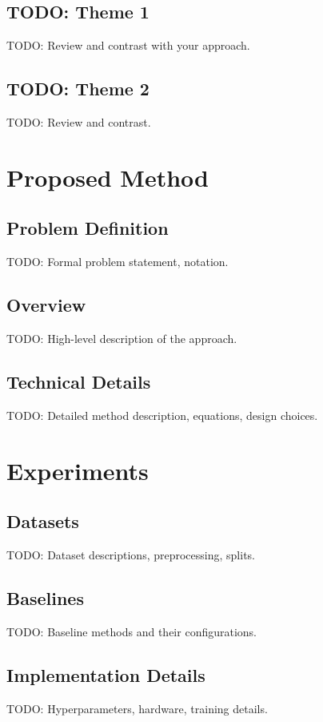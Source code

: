 \documentclass[preprint,12pt]{elsarticle}
\begin{document}
\subsection{TODO: Theme 1}
TODO: Review and contrast with your approach.

\subsection{TODO: Theme 2}
TODO: Review and contrast.

\section{Proposed Method}
\label{sec:method}

\subsection{Problem Definition}
TODO: Formal problem statement, notation.

\subsection{Overview}
TODO: High-level description of the approach.

\subsection{Technical Details}
TODO: Detailed method description, equations, design choices.

\section{Experiments}
\label{sec:experiments}

\subsection{Datasets}
TODO: Dataset descriptions, preprocessing, splits.

\subsection{Baselines}
TODO: Baseline methods and their configurations.

\subsection{Implementation Details}
TODO: Hyperparameters, hardware, training details.
\end{document}
